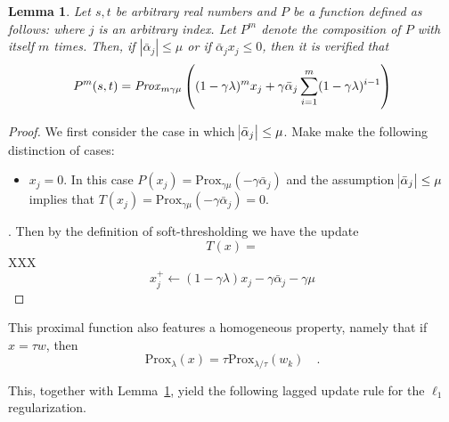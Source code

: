 \documentclass{scrartcl}
\newtheorem{lemma}[theorem]{Lemma}
\begin{document}
\begin{lemma}\label{lemma:update_l1}
Let $s, t$ be arbitrary real numbers and $P$ be a function defined as follows:
where $j$ is an arbitrary index. Let $P^m$ denote the composition of $P$ with itself $m$ times. Then, if $|\bar{\alpha}_j| \leq \mu$ or if $\bar{\alpha}_j x_j \leq 0$, then it is verified that
$$
P^m(s, t) = 
\text{\emph{Prox}}_{m \gamma \mu}\left((1 - \gamma \lambda)^{m} x_j + \gamma \bar{\alpha}_j \sum_{i=1}^{m} (1 - \gamma \lambda)^{i-1}\right)
$$
\end{lemma}
\begin{proof}
We first consider the case in which $\abs{\bar{\alpha}_j} \leq \mu$. Make make the following distinction of cases:
\begin{itemize}
\item $x_j = 0$. In this case $P(x_j) = \text{{Prox}}_{\gamma \mu}(- \gamma \bar{\alpha}_j)$ and the assumption $\abs{\bar{\alpha}_j} \leq \mu$ implies that $T(x_j) = \text{{Prox}}_{\gamma \mu}(- \gamma \bar{\alpha}_j) = 0$.
\end{itemize}
. Then by the definition of soft-thresholding we have the update
$$
T(x) = 
$$
XXX
$$
x_j^+ \gets (1 - \gamma \lambda)x_j - \gamma \bar{\alpha}_j - \gamma \mu
$$
\end{proof}


This proximal function also features a homogeneous property, namely that if $x = \tau w$, then 
$$
\text{Prox}_\lambda(x) = \tau \text{Prox}_{\lambda /\tau}(w_k) \quad.
$$

This, together with Lemma~\ref{lemma:update_l1}, yield the following lagged update rule for the $\ell_1$ regularization.




\end{document}
